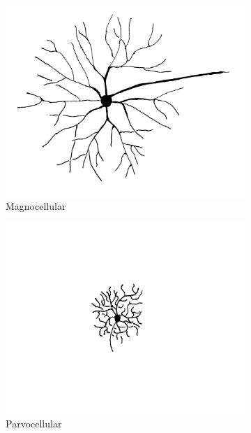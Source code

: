 \documentclass{pracalicmgr}
\begin{document}
	\begin{figure}[H]
	\begin{subfigure}{.33\textwidth}
		\centering
		\includegraphics[width=1.\linewidth]{cell_M2.png}
		\caption{Magnocellular}
		\label{rys:magno}
	\end{subfigure}%
	\begin{subfigure}{.33\textwidth}
		\centering
		\includegraphics[width=1\linewidth]{cell_P2.png}
		\caption{Parvocellular}
		\label{rys:parvo}
	\end{subfigure}
	\begin{subfigure}{.33\textwidth}
	\centering

\end{subfigure}
\end{figure}
\end{document}
